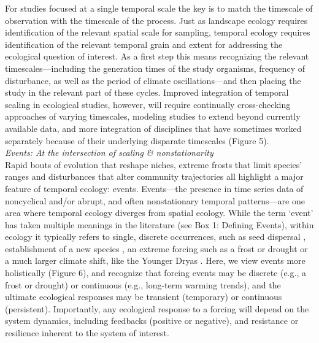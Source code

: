 \documentclass[11pt,a4paper,oneside]{article}
\begin{document}
For studies focused at a single temporal scale the key is to match the timescale of observation with the timescale of the process. Just as landscape ecology requires identification of the relevant spatial scale for sampling, temporal ecology requires identification of the relevant temporal grain and extent for addressing the ecological question of interest. As a first step this means recognizing the relevant timescales---including the generation times of the study organisms, frequency of disturbance, as well as the period of climate oscillations---and then placing the study in the relevant part of these cycles. Improved integration of temporal scaling in ecological studies, however, will require continually cross-checking approaches of varying timescales, modeling studies to extend beyond currently available data, and more integration of disciplines that have sometimes worked separately because of their underlying disparate timescales (Figure 5). \\

\noindent \emph{Events: At the intersection of scaling \& nonstationarity}\\
Rapid bouts of evolution that reshape niches, extreme frosts that limit species' ranges and disturbances that alter community trajectories all highlight a major feature of temporal ecology: events. Events---the presence in time series data of noncyclical and/or abrupt, and often nonstationary temporal patterns---are one area where temporal ecology diverges from spatial ecology. While the term `event' has taken multiple meanings in the literature (see Box 1: Defining Events), within ecology it typically refers to single, discrete occurrences, such as seed dispersal \citep{Higgins2003}, establishment of a new species \citep{Blackburn2011}, an extreme forcing such as a frost or drought \citep{Jentsch:2009ff} or a much larger climate shift, like the Younger Dryas \citep{Jackson:2009el}. Here, we view events more holistically (Figure 6), and recognize that forcing events may be discrete (e.g., a frost or drought) or continuous (e.g., long-term warming trends), and the ultimate ecological responses may be transient (temporary) or continuous (persistent). Importantly, any ecological response to a forcing will depend on the system dynamics, including feedbacks (positive or negative), and resistance or resilience inherent to the system of interest. 
\end{document}
